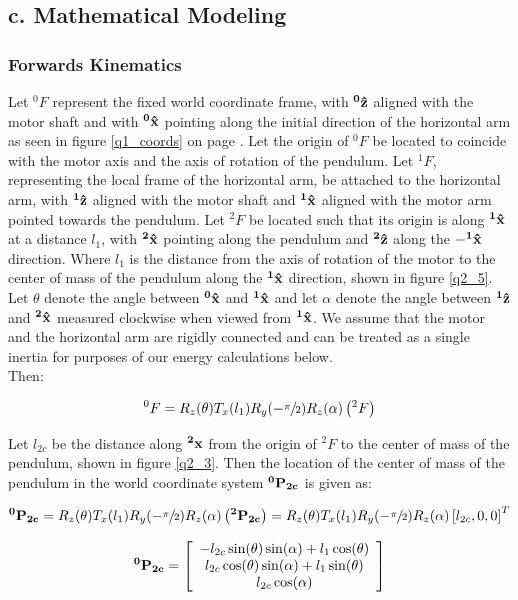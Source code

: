 \documentclass{article}
\theoremstyle{plain}
\theoremstyle{definition}
\theoremstyle{remark}
\begin{document}
\subsection*{c. Mathematical Modeling}
\subsubsection*{Forwards Kinematics}
Let $^0F$ represent the fixed world coordinate frame, with $\bf{^0\hat{z}}$ aligned with the motor shaft and with $\bf{^0\hat{x}}$ pointing along the initial direction of the horizontal arm as seen in figure \ref{q1_coords} on page \pageref{q1_coords}.  Let the origin of $^0F$ be located to coincide with the motor axis and the axis of rotation of the pendulum.  Let $^1F$, representing the local frame of the horizontal arm, be attached to the horizontal arm, with $\bf{^1\hat{z}}$ aligned with the motor shaft and $\bf{^1\hat{x}}$ aligned with the motor arm pointed towards the pendulum.  Let $^2F$ be located such that its origin is along $\bf{^1\hat{x}}$ at a distance $l_1$, with $\bf{^2\hat{x}}$ pointing along the pendulum and $\bf{^2\hat{z}}$ along the $\bf{-^1\hat{x}}$ direction.  Where $l_1$ is the distance from the axis of rotation of the motor to the center of mass of the pendulum along the $\bf{^1\hat{x}}$ direction, shown in figure \ref{q2_5}.  Let $\theta$ denote the angle between $\bf{^0\hat{x}}$ and $\bf{^1\hat{x}}$ and let $\alpha$ denote the angle between $\bf{^1\hat{z}}$ and $\bf{^2\hat{x}}$ measured clockwise when viewed from $\bf{^1\hat{x}}$.  We assume that the motor and the horizontal arm are rigidly connected and can be treated as a single inertia for purposes of our energy calculations below.\\

Then:

$$ ^0F = R_{z}(\theta) T_{x}(l_{1}) R_{y}(-\sfrac{\pi}{2}) R_{z}(\alpha) \left(^2F\right) $$

Let $l_{2c}$ be the distance along $\bf{^2x}$ from the origin of $^2F$ to the center of mass of the pendulum, shown in figure \ref{q2_3}.  Then the location of the center of mass of the pendulum in the world coordinate system $\bf{^0P_{2c}}$ is given as:

$$ {\bf{^0P_{2c}}} = R_{z}(\theta) T_{x}(l_{1}) R_{y}(-\sfrac{\pi}{2}) R_{z}(\alpha) \left(\bf{^2P_{2c}}\right) = R_{z}(\theta) T_{x}(l_{1}) R_{y}(-\sfrac{\pi}{2}) R_{z}(\alpha) \left[l_{2c}, 0, 0\right]^T$$

\[
  {\bf{^0P_{2c}}} = \left[
  \begin{array}{c l}
	 -l_{2c} \sin(\theta) \sin(\alpha) + l_{1} \cos(\theta) \\
	l_{2c} \cos(\theta) \sin(\alpha) + l_1 \sin(\theta) \\
	l_{2c} \cos(\alpha) 
  \end{array} \right]
\]
\end{document}
